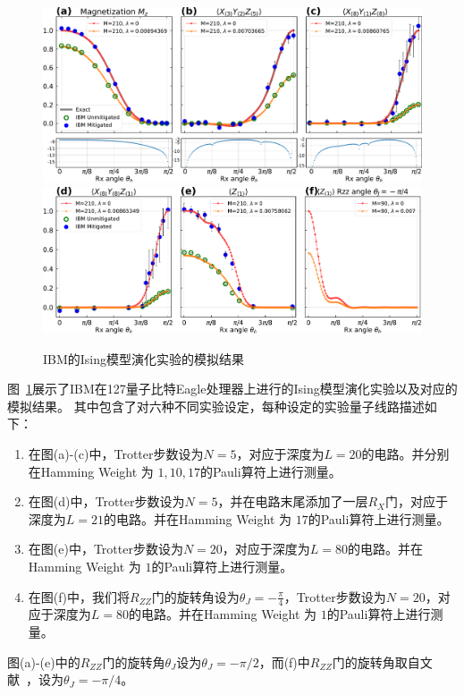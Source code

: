 \begin{figure}[htbp]
    \centering
    \includegraphics[width=\textwidth]{figures/IBM_F3}
    \includegraphics[width=\textwidth]{figures/IBM_F4}
    \caption{IBM的Ising模型演化实验的模拟结果}\label{fig:IBM}
\end{figure}


图~\ref{fig:IBM}展示了IBM在127量子比特Eagle处理器上进行的Ising模型演化实验以及对应的模拟结果。
其中包含了对六种不同实验设定，每种设定的实验量子线路描述如下：
\begin{enumerate}
    \item 在图(a)-(c)中，Trotter步数设为$N=5$，对应于深度为$L=20$的电路。并分别在Hamming Weight 为 $1,10,17$的Pauli算符上进行测量。
    \item 在图(d)中，Trotter步数设为$N=5$，并在电路末尾添加了一层$R_{X}$门，对应于深度为$L=21$的电路。并在Hamming Weight 为 $17$的Pauli算符上进行测量。
    \item 在图(e)中，Trotter步数设为$N=20$，对应于深度为$L=80$的电路。并在Hamming Weight 为 $1$的Pauli算符上进行测量。
    \item 在图(f)中，我们将$R_{ZZ}$门的旋转角设为$\theta_J=-\frac{\pi}{4}$，Trotter步数设为$N=20$，对应于深度为$L=80$的电路。并在Hamming Weight 为 $1$的Pauli算符上进行测量。
\end{enumerate}
图(a)-(e)中的$R_{ZZ}$门的旋转角$\theta_J$设为$\theta_J=-\pi/2$，而(f)中$R_{ZZ}$门的旋转角取自文献~\cite{anand2023classical}，设为$\theta_J=-\pi/4$。

